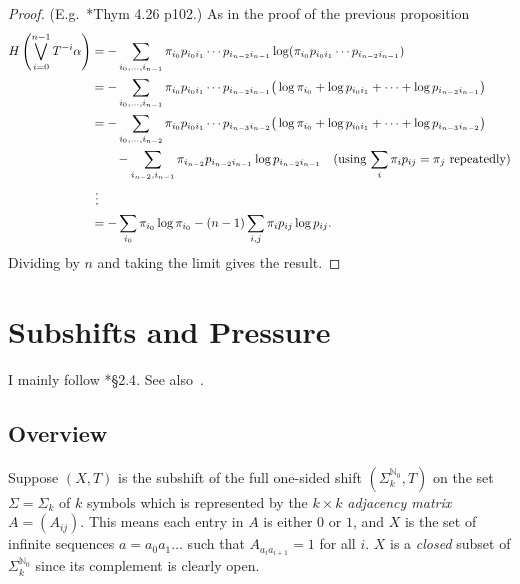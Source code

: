 \documentclass[a4paper]{amsart}
\theoremstyle{plain}
\theoremstyle{definition}
\theoremstyle{remark}
\begin{document}
\begin{proof} (E.g.\ \cite{Wal}*{Thym 4.26 p102}.)
As in the proof of the previous proposition
\begin{align*}
H\left(\bigvee_{i=0}^{n-1} T^{-i} \alpha \right)
&= -\sum_{i_0,\dots, i_{n-1}}  \pi_{i_0}p_{i_0i_1} \cdots  p_{i_{n-2}i_{n-1}} 
                                   \log( \pi_{i_0}p_{i_0i_1} \cdots  p_{i_{n-2}i_{n-1}}  )\\
&= -\sum_{i_0,\dots, i_{n-1}}  \pi_{i_0}p_{i_0i_1} \cdots  p_{i_{n-2}i_{n-1}} 
                                  \big(  \log  \pi_{i_0} + \log p_{i_0i_1} + \cdots + \log  p_{i_{n-2}i_{n-1}}  \big)\\
&= -\sum_{i_0,\dots, i_{n-2}}  \pi_{i_0}p_{i_0i_1} \cdots  p_{i_{n-3}i_{n-2}} 
                                  \big(  \log  \pi_{i_0} + \log p_{i_0i_1} + \cdots + \log  p_{i_{n-3}i_{n-2}}  \big) \\
      &\qquad   -\sum_{i_{n-2},i_{n-1}} \pi_{i_{n-2} } p_{i_{n-2}i_{n-1}} \log p_{i_{n-2}i_{n-1}} 
      \quad \text{(using $  \sum_i \pi_ip_{ij} = \pi_j$ repeatedly)} \\
&\ \vdots    \\
&=  -\sum_{i_0}\pi_{i_0} \log\pi_{i_0}  - (n-1)\sum_{i,j}\pi_i p_{ij} \log p_{ij}.
\end{align*} 
Dividing by $ n $ and taking the limit gives the result.
\end{proof} 


\section{\textbf{Subshifts and Pressure}} \label{secsp}
I mainly follow \cite{Kea}*{\S 2.4}.  See also~\cite{Kea72}.

\subsection{Overview} \label{secov} Suppose $ (X,T) $  is the subshift of the full one-sided shift   $ (\Sigma_k^{\mathbb{N}_0}, T) $ on the set $ \Sigma = \Sigma_k $ of $ k $ symbols which is represented by the $ k \times k $ \emph{adjacency matrix} $ A =(A_{ij}) $.
This means each entry in $ A $ is either $ 0 $ or $ 1 $, and  $ X $ is the set of infinite sequences $a =  a_0a_1\dots $ such that $ A_{a_ia_{i+1}} = 1 $ for all $ i $.  $ X $  is a \emph{closed}  subset of  $ \Sigma_k^{\mathbb{N}_0}$   since its complement is clearly  open.   
\end{document}
